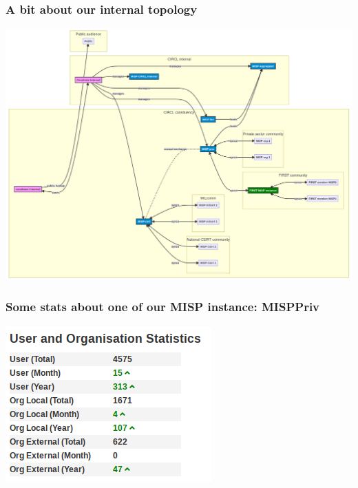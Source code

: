 \begin{frame}
\frametitle{A bit about our internal topology}
  \begin{center}
    \includegraphics[width=1\linewidth]{pictures/our_topology.png}
  \end{center}
\end{frame}

\begin{frame}
    \frametitle{Some stats about one of our MISP instance: MISPPriv}
      \begin{center}
    \includegraphics[width=0.6\linewidth]{pictures/misppriv-user-org-stats.png}
      \end{center}
\end{frame}

